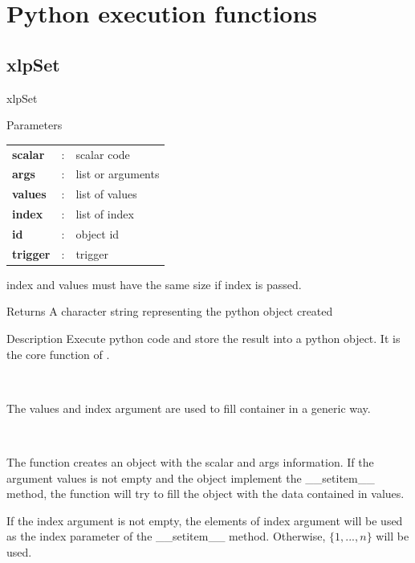 \section{Python execution functions}

\subsection{xlpSet}

\begin{xlpfunctitle}{xlpSet}

\begin{xlpfunc}{Parameters}
\begin{tabular}{p{3.5cm}cl}
\textbf{scalar}& : & scalar code \\
\textbf{args}& : & list or arguments \\
\textbf{values}& : & list of values \\
\textbf{index}& : & list of index  \\
\textbf{id}& : & object id \\
\textbf{trigger}& : & trigger \\
\end{tabular}

\vspace{2mm}

index and values must have the same size if index is passed.
\end{xlpfunc}


\begin{xlpfunc}{Returns}
A character string representing the python object created
\end{xlpfunc}

\begin{xlpfunc}{Description}
Execute python code and store the result into a python object. It is the core function of \xlp. 

\

The values and index argument are used to fill container in a generic way.

\

The function creates an object with the scalar and args information. If the argument values is not empty and the object implement the \_\_setitem\_\_ method, the function will try to fill the object with the data contained in values. 

If the index argument is not empty, the elements of index argument will be used as the index parameter of the \_\_setitem\_\_ method. Otherwise, $\{1, ..., n\}$ will be used.


\end{xlpfunc}
\end{xlpfunctitle}
